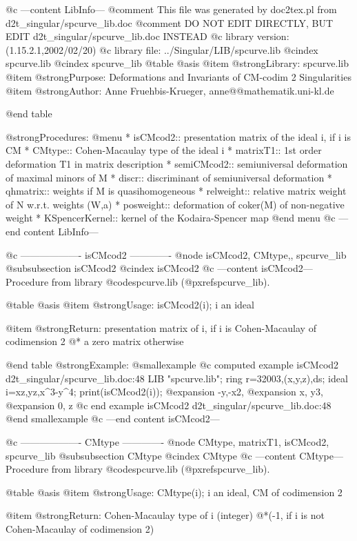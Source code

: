 @c ---content LibInfo---
@comment This file was generated by doc2tex.pl from d2t_singular/spcurve_lib.doc
@comment DO NOT EDIT DIRECTLY, BUT EDIT d2t_singular/spcurve_lib.doc INSTEAD
@c library version: (1.15.2.1,2002/02/20)
@c library file: ../Singular/LIB/spcurve.lib
@cindex spcurve.lib
@cindex spcurve_lib
@table @asis
@item @strong{Library:}
spcurve.lib
@item @strong{Purpose:}
    Deformations and Invariants of CM-codim 2 Singularities
@item @strong{Author:}
Anne Fruehbis-Krueger, anne@@mathematik.uni-kl.de

@end table

@strong{Procedures:}
@menu
* isCMcod2:: presentation matrix of the ideal i, if i is CM
* CMtype:: Cohen-Macaulay type of the ideal i
* matrixT1:: 1st order deformation T1 in matrix description
* semiCMcod2:: semiuniversal deformation of maximal minors of M
* discr:: discriminant of semiuniversal deformation
* qhmatrix:: weights if M is quasihomogeneous
* relweight:: relative matrix weight of N w.r.t. weights (W,a)
* posweight:: deformation of coker(M) of non-negative weight
* KSpencerKernel:: kernel of the Kodaira-Spencer map
@end menu
@c ---end content LibInfo---

@c ------------------- isCMcod2 -------------
@node isCMcod2, CMtype,, spcurve_lib
@subsubsection isCMcod2
@cindex isCMcod2
@c ---content isCMcod2---
Procedure from library @code{spcurve.lib} (@pxref{spcurve_lib}).

@table @asis
@item @strong{Usage:}
isCMcod2(i); i an ideal

@item @strong{Return:}
presentation matrix of i, if i is Cohen-Macaulay of codimension 2 @*
a zero matrix otherwise

@end table
@strong{Example:}
@smallexample
@c computed example isCMcod2 d2t_singular/spcurve_lib.doc:48 
LIB "spcurve.lib";
ring r=32003,(x,y,z),ds;
ideal i=xz,yz,x^3-y^4;
print(isCMcod2(i));
@expansion{} -y,-x2,
@expansion{} x, y3, 
@expansion{} 0, z   
@c end example isCMcod2 d2t_singular/spcurve_lib.doc:48
@end smallexample
@c ---end content isCMcod2---

@c ------------------- CMtype -------------
@node CMtype, matrixT1, isCMcod2, spcurve_lib
@subsubsection CMtype
@cindex CMtype
@c ---content CMtype---
Procedure from library @code{spcurve.lib} (@pxref{spcurve_lib}).

@table @asis
@item @strong{Usage:}
CMtype(i); i an ideal, CM of codimension 2

@item @strong{Return:}
Cohen-Macaulay type of i (integer)
@*(-1, if i is not Cohen-Macaulay of codimension 2)

